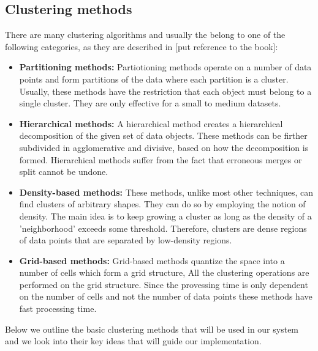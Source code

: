 \subsection{Clustering methods}
There are many clustering algorithms and usually the belong to one of the following categories, as they are described in [put reference to the book]:

\begin{itemize}
 \item \textbf{Partitioning methods:} Partiotioning methods operate on a number of data points and form partitions of the data where each partition is a cluster. Usually, these methods have the restriction that each object must belong to a single cluster. They are only effective for a small to medium datasets. 
 \item \textbf{Hierarchical methods:} A hierarchical method creates a hierarchical decomposition of the given set of data objects. These methods can be firther subdivided 
 in agglomerative and divisive, based on how the decomposition is formed. Hierarchical methods suffer from the fact that erroneous merges or split cannot be undone. 
 \item \textbf{Density-based methods:} These methods, unlike most other techniques, can find clusters of arbitrary shapes. They can do so by employing the notion of density. The
 main idea is to keep growing a cluster as long as the density of a 'neighborhood' exceeds some threshold. Therefore, clusters are dense regions of data points that are separated 
 by low-density regions.
 \item \textbf{Grid-based methods:} Grid-based methods quantize the space into a number of cells which form a grid structure, All the clustering operations are performed on the grid structure. Since the provessing time is only dependent on the number of cells and not the number of data points these methods have fast processing time. 
\end{itemize}\vspace{15pt}

Below we outline the basic clustering methods that will be used in our system and we look into their key ideas that will guide 
our implementation. 

